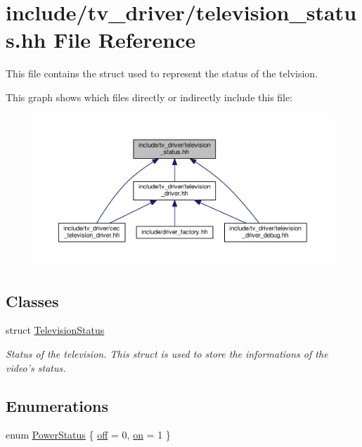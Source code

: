 \hypertarget{television__status_8hh}{\section{include/tv\+\_\+driver/television\+\_\+status.hh File Reference}
\label{television__status_8hh}
}


This file contains the struct used to represent the status of the telvision.  


This graph shows which files directly or indirectly include this file\+:
\nopagebreak
\begin{figure}[H]
\begin{center}
\leavevmode
\includegraphics[width=350pt]{television__status_8hh__dep__incl}
\end{center}
\end{figure}
\subsection*{Classes}
\begin{DoxyCompactItemize}
\item 
struct \hyperlink{structTelevisionStatus}{Television\+Status}
\begin{DoxyCompactList}\small\item\em Status of the television. This struct is used to store the informations of the video's status. \end{DoxyCompactList}\end{DoxyCompactItemize}
\subsection*{Enumerations}
\begin{DoxyCompactItemize}
\item 
enum \hyperlink{television__status_8hh_a65e6bb4d942c22dba9975253b0a1d73f}{Power\+Status} \{ \hyperlink{television__status_8hh_a65e6bb4d942c22dba9975253b0a1d73fa53ace14c115e45153a1c9105accceb4c}{off} = 0, 
\hyperlink{television__status_8hh_a65e6bb4d942c22dba9975253b0a1d73faf3be4933da71233c5904ec919ac1fdb0}{on} = 1
 \}
\end{DoxyCompactItemize}


